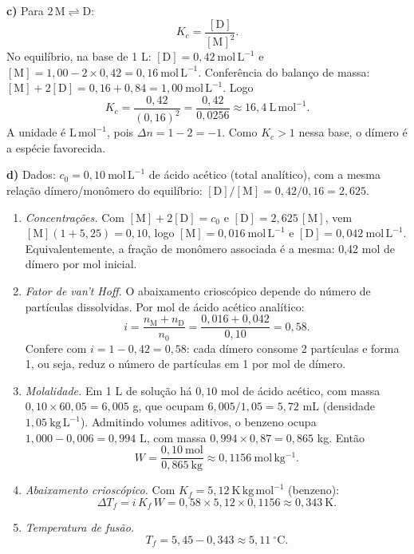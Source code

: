 \documentclass{article}%
\begin{document}
\textbf{c)} Para $2\,\mathrm{M}\rightleftharpoons\mathrm{D}$:
\[
K_c=\frac{[\mathrm{D}]}{[\mathrm{M}]^2}.
\]
No equilíbrio, na base de 1 L: $[\mathrm{D}]=0{,}42\ \mathrm{mol\,L^{-1}}$ e $[\mathrm{M}]=1{,}00-2\times0{,}42=0{,}16\ \mathrm{mol\,L^{-1}}$. Conferência do balanço de massa: $[\mathrm{M}]+2[\mathrm{D}]=0{,}16+0{,}84=1{,}00\ \mathrm{mol\,L^{-1}}$. Logo
\[
K_c=\frac{0{,}42}{(0{,}16)^2}=\frac{0{,}42}{0{,}0256}\approx 16{,}4\ \mathrm{L\,mol^{-1}}.
\]
A unidade é $\mathrm{L\,mol^{-1}}$, pois $\Delta n=1-2=-1$. Como $K_c>1$ nessa base, o dímero é a espécie favorecida.

\textbf{d)} Dados: $c_0=0{,}10\ \mathrm{mol\,L^{-1}}$ de ácido acético (total analítico), com a mesma relação dímero/monômero do equilíbrio: $[\mathrm{D}]/[\mathrm{M}]=0{,}42/0{,}16=2{,}625$.

\begin{enumerate}
\item \textit{Concentrações.} Com $[\mathrm{M}]+2[\mathrm{D}]=c_0$ e $[\mathrm{D}]=2{,}625\,[\mathrm{M}]$, vem $[\mathrm{M}](1+5{,}25)=0{,}10$, logo $[\mathrm{M}]=0{,}016\ \mathrm{mol\,L^{-1}}$ e $[\mathrm{D}]=0{,}042\ \mathrm{mol\,L^{-1}}$. Equivalentemente, a fração de monômero associada é a mesma: 0,42 mol de dímero por mol inicial.

\item \textit{Fator de van't Hoff.} O abaixamento crioscópico depende do número de partículas dissolvidas. Por mol de ácido acético analítico:
\[
i=\frac{n_{\mathrm{M}}+n_{\mathrm{D}}}{n_0}=\frac{0{,}016+0{,}042}{0{,}10}=0{,}58.
\]
Confere com $i=1-0{,}42=0{,}58$: cada dímero consome 2 partículas e forma 1, ou seja, reduz o número de partículas em 1 por mol de dímero.

\item \textit{Molalidade.} Em 1 L de solução há $0{,}10$ mol de ácido acético, com massa $0{,}10\times60{,}05=6{,}005$ g, que ocupam $6{,}005/1{,}05=5{,}72$ mL (densidade $1{,}05\ \mathrm{kg\,L^{-1}}$). Admitindo volumes aditivos, o benzeno ocupa $1{,}000-0{,}006=0{,}994$ L, com massa $0{,}994\times0{,}87=0{,}865$ kg. Então
\[
W=\frac{0{,}10\ \mathrm{mol}}{0{,}865\ \mathrm{kg}}\approx 0{,}1156\ \mathrm{mol\,kg^{-1}}.
\]

\item \textit{Abaixamento crioscópico.} Com $K_f=5{,}12\ \mathrm{K\,kg\,mol^{-1}}$ (benzeno):
\[
\Delta T_f=i\,K_f\,W=0{,}58\times5{,}12\times0{,}1156\approx 0{,}343\ \mathrm{K}.
\]

\item \textit{Temperatura de fusão.}
\[
T_f=5{,}45-0{,}343\approx 5{,}11\ ^\circ\mathrm{C}.
\]
\end{enumerate}
\end{document}
